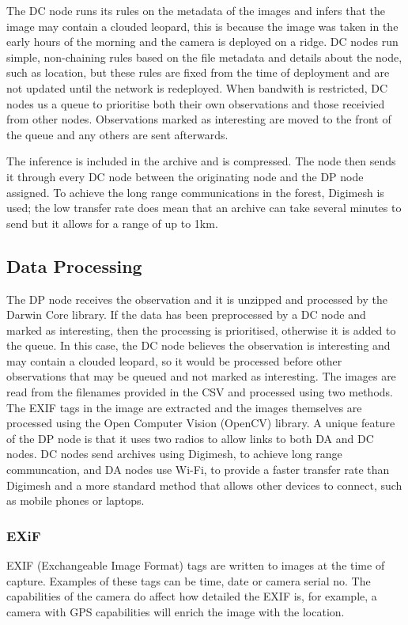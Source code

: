 			The DC node runs its rules on the metadata of the images and infers that the image may contain a clouded leopard, this is because the image was taken in the early hours of the morning and the camera is deployed on a ridge. DC nodes run simple, non-chaining rules based on the file metadata and details about the node, such as location, but these rules are fixed from the time of deployment and are not updated until the network is redeployed. When bandwith is restricted, DC nodes us a queue to prioritise both their own observations and those receivied from other nodes. Observations marked as interesting are moved to the front of the queue and any others are sent afterwards.
			
			The inference is included in the archive and is compressed. The node then sends it through every DC node between the originating node and the DP node assigned. To achieve the long range communications in the forest, Digimesh is used; the low transfer rate does mean that an archive can take several minutes to send but it allows for a range of up to 1km.

	\subsection{Data Processing}			
			The DP node receives the observation and it is unzipped and processed by the Darwin Core library. If the data has been preprocessed by a DC node and marked as interesting, then the processing is prioritised, otherwise it is added to the queue. In this case, the DC node believes the observation is interesting and may contain a clouded leopard, so it would be processed before other observations that may be queued and not marked as interesting. The images are read from the filenames provided in the CSV and processed using two methods. The EXIF tags in the image are extracted and the images themselves are processed using the Open Computer Vision (OpenCV) library. A unique feature of the DP node is that it uses two radios to allow links to both DA and DC nodes. DC nodes send archives using Digimesh, to achieve long range communcation, and DA nodes use Wi-Fi, to provide a faster transfer rate than Digimesh and a more standard method that allows other devices to connect, such as mobile phones or laptops.
			
		\subsubsection{EXiF}
			EXIF (Exchangeable Image Format) tags are written to images at the time of capture. Examples of these tags can be time, date or camera serial no. The capabilities of the camera do affect how detailed the EXIF is, for example, a camera with GPS capabilities will enrich the image with the location. 
			
